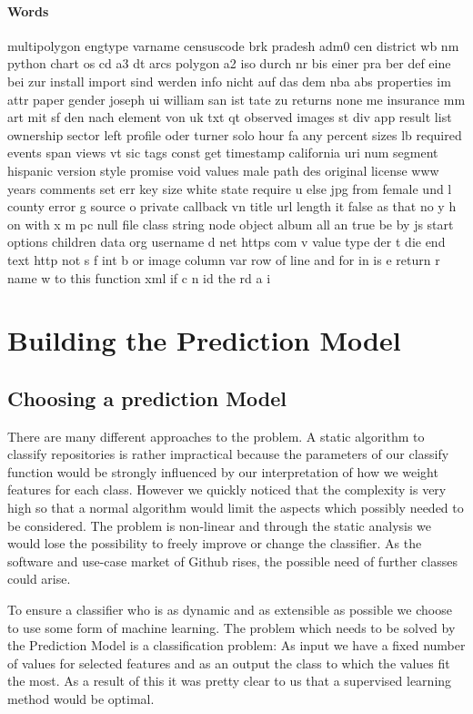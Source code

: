 \documentclass[paper=A4,pagesize=auto,12pt,headinclude=true,footinclude=true,BCOR=0mm,DIV=calc]{scrartcl}
\begin{document}
	\paragraph{Words}
	multipolygon engtype varname censuscode brk pradesh adm0 cen district wb nm python chart os cd a3 dt arcs polygon a2 iso durch nr bis einer pra ber def eine bei zur install import sind werden info nicht auf das dem nba abs properties im attr paper gender joseph ui william san ist tate zu returns none me insurance mm art mit sf den nach element von uk txt qt observed images st div app result list ownership sector left profile oder turner solo hour fa any percent sizes lb required events span views vt sic tags const get timestamp california uri num segment hispanic version style promise void values male path des original license www years comments set err key size white state require u else jpg from female und l county error g source o private callback vn title url length it false as that no y h on with x m pc null file class string node object album all an true be by js start options children data org username d net https com v value type der t die end text http not s f int b or image column var row of line and for in is e return r name w to this function xml if c n id the rd a i
	
	\section{Building the Prediction Model}
	
	\subsection{Choosing a prediction Model}
	There are many different approaches to the problem. A static algorithm to classify repositories is rather impractical because the parameters of our classify function would be strongly influenced by our interpretation of how we weight features for each class. However we quickly noticed that the complexity is very high so that a normal algorithm would limit the aspects which possibly needed to be considered. The problem is non-linear and through the static analysis we would lose the possibility to freely improve or change the classifier. As the software and use-case market of Github rises, the possible need of further classes could arise.
	
	To ensure a classifier who is as dynamic and as extensible as possible we choose to use some form of machine learning.
	The problem which needs to be solved by the Prediction Model is a classification problem: As input we have a fixed number of values for selected features  and as an output the class to which the values fit the most. As a result of this it was pretty clear to us that a supervised learning method would be optimal.
	
\end{document}
